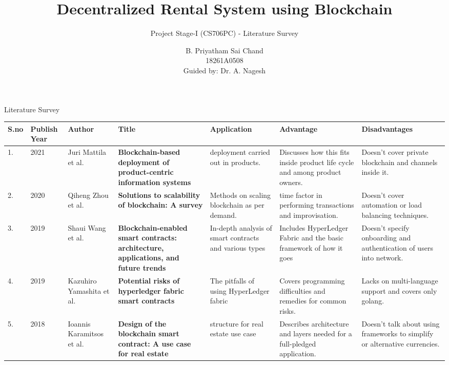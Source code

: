 \documentclass[xcolor=table]{beamer}
\title{\fontsize{12.5pt}{20}\selectfont Decentralized Rental System using Blockchain}
\subtitle{Project Stage-I (CS706PC) - Literature Survey}
\author[my name]{B. Priyatham Sai Chand \\ \footnotesize 18261A0508  \\ Guided by: Dr. A. Nagesh }
\date{}
\begin{document}

\begin{frame}
	\maketitle
\end{frame}
\begin{frame}{Literature Survey}

	\fontsize{5.5pt}{8}\selectfont
\begin{center}
	\begin{tabular}{ |p{1.2em}|p{2.4em}|p{4.0em}|p{10em}|p{8em}|p{8em}|p{8em}|} 
\hline
S.no & Publish Year & Author & Title & Application & Advantage & Disadvantages \\
\hline
1. & 2021 &Juri Mattila et al.&\textbf{Blockchain-based deployment of product-centric information systems} &  deployment carried out in products. &Discusses how this fits inside product life cycle and among product owners. & Doesn't cover private blockchain and channels inside it.\\ 
\hline
2. & 2020 &Qiheng Zhou et al.&\textbf{Solutions to scalability of blockchain: A survey} & Methods on scaling blockchain as per demand.  &  time factor in performing transactions and improvisation.  &Doesn't cover automation or load balancing techniques.\\ 
\hline
3. & 2019& Shaui Wang et al.&\textbf{Blockchain-enabled smart contracts: architecture, applications, and future trends}& In-depth analysis of smart contracts and various types  & Includes HyperLedger Fabric and the basic framework of how it goes& Doesn't specify  onboarding and authentication of users into network. \\ 
\hline
4. & 2019& Kazuhiro Yamashita et al.  & \textbf{Potential risks of hyperledger fabric smart contracts} & The pitfalls of using HyperLedger fabric & Covers programming difficulties and remedies for common risks. & Lacks on multi-language support and covers only golang.\\ 
\hline
5. & 2018 &Ioannis Karamitsos et al. & \textbf{Design of the blockchain smart contract: A use case for real estate}&structure for real estate use case & Describes architecture and layers needed for a full-pledged application. & Doesn't talk about using frameworks to simplify or alternative currencies. \\ 
\hline

\end{tabular}    
\end{center}
\end{frame}
\end{document}
